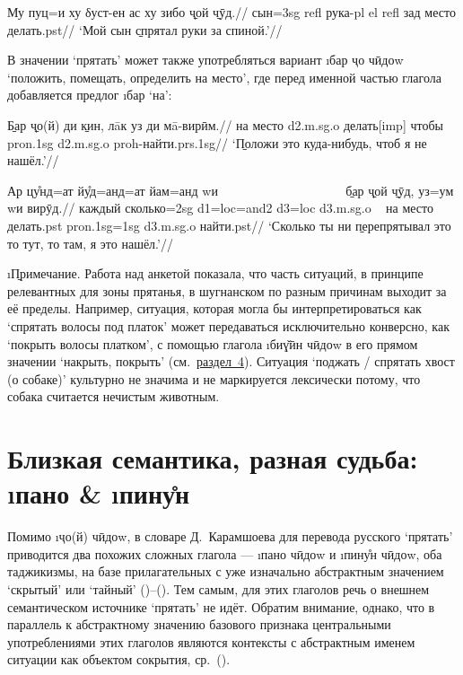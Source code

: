 \begingl
\gla Му пуц=и ху δуст-ен ас ху зибо \b{ҷой} \b{чӯд}.//
 сын={\sc 3sg} {\sc refl} рука-{\sc pl} {\sc el} {\sc refl} зад место делать.{\sc pst}//
\glft ‘Мой сын \b{спрятал} руки за спиной.’//
\endgl \xe

В значении ‘прятать’ может также употребляться вариант \i{бар ҷо чӣдоw} ‘положить, помещать, определить на место’, где перед именной частью глагола добавляется предлог \i{бар} ‘на’:

\begingl
\gla \b{Бар} \b{ҷо(й)} ди \b{кин}, лāк уз ди мā-вирӣм.//
\glc на место {\sc d2.m.sg.o} делать[{\sc imp}] чтобы {\sc pron.1sg} {\sc d2.m.sg.o} {\sc proh}-найти.{\sc prs.1sg}//
\glft ‘\b{Положи} это куда-нибудь, чтоб я не нашёл.’//
\endgl \xe

\begingl
\gla Ар цу̊нд=ат йу̊д=анд=ат йам=анд wи ~~~~~~~~~~~~~~~~~~~ \b{бар} \b{ҷой} \b{чӯд}, уз=ум wи вирӯд.//
\glc каждый сколько={\sc 2sg} {\sc d1=loc=and2} {\sc d3=loc} {\sc d3.m.sg.o} ~ на место делать.{\sc pst} {\sc pron.1sg=1sg} {\sc d3.m.sg.o} найти.{\sc pst}//
\glft ‘Сколько ты ни \b{перепрятывал} это то тут, то там, я это нашёл.’//
\endgl \xe

\i{\b{Примечание}}. Работа над анкетой показала, что часть ситуаций, в принципе релевантных для зоны прятанья, в шугнанском по разным причинам выходит за её пределы. Например, ситуация, которая могла бы интерпретироваться как ‘спрятать волосы под платок’ может передаваться исключительно конверсно, как ‘покрыть волосы платком’, с помощью глагола \i{биɣ̌ӣн чӣдоw} в его прямом значении ‘накрыть, покрыть’ (см.~\hyperref[hide-rare]{раздел~4}). Ситуация ‘поджать / спрятать хвост (о собаке)’ культурно не значима и не маркируется лексически потому, что собака считается нечистым животным.

\section{Близкая семантика, разная судьба: \i{пано} \& \i{пину̊н}} \label{hide-pano}

Помимо \i{ҷо(й) чӣдоw}, в словаре Д.~Карамшоева для перевода русского ‘прятать’ приводится два похожих сложных глагола — \i{пано чӣдоw} и \i{пину̊н чӣдоw}, оба таджикизмы, на базе прилагательных с уже изначально абстрактным значением ‘скрытый’ или ‘тайный’ ()–(). Тем самым, для этих глаголов речь о внешнем семантическом источнике ‘прятать’ не идёт. Обратим внимание, однако, что в параллель к абстрактному значению базового признака центральными употреблениями этих глаголов являются контексты с абстрактным именем ситуации как объектом сокрытия, ср.~().

